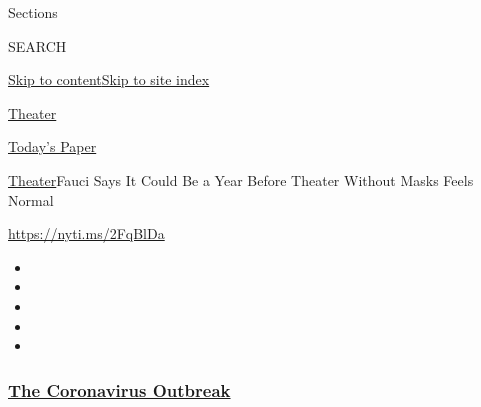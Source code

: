 Sections

SEARCH

\protect\hyperlink{site-content}{Skip to
content}\protect\hyperlink{site-index}{Skip to site index}

\href{https://www.nytimes3xbfgragh.onion/section/theater}{Theater}

\href{https://myaccount.nytimes3xbfgragh.onion/auth/login?response_type=cookie\&client_id=vi}{}

\href{https://www.nytimes3xbfgragh.onion/section/todayspaper}{Today's
Paper}

\href{/section/theater}{Theater}\textbar{}Fauci Says It Could Be a Year
Before Theater Without Masks Feels Normal

\url{https://nyti.ms/2FqBlDa}

\begin{itemize}
\item
\item
\item
\item
\item
\end{itemize}

\hypertarget{the-coronavirus-outbreak}{%
\subsubsection{\texorpdfstring{\href{https://www.nytimes3xbfgragh.onion/news-event/coronavirus?name=styln-coronavirus-national\&region=TOP_BANNER\&block=storyline_menu_recirc\&action=click\&pgtype=Article\&impression_id=814d02b0-f52e-11ea-89a3-d9fd6cbe23e4\&variant=undefined}{The
Coronavirus
Outbreak}}{The Coronavirus Outbreak}}\label{the-coronavirus-outbreak}}

